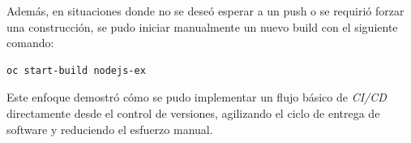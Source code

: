     Además, en situaciones donde no se deseó esperar a un push o se requirió forzar una construcción, se pudo iniciar manualmente un nuevo build con el siguiente comando:
    \begin{verbatim}
oc start-build nodejs-ex
    \end{verbatim}

    Este enfoque demostró cómo se pudo implementar un flujo básico de \textit{CI/CD} directamente desde el control de versiones, agilizando el ciclo de entrega de software y reduciendo el esfuerzo manual.

\newpage